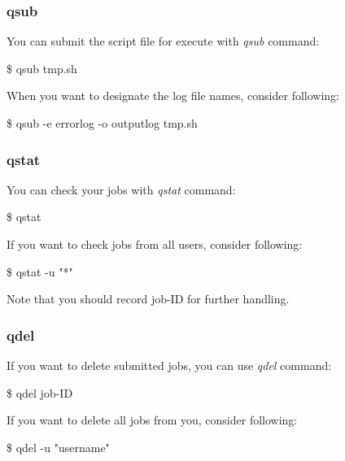 \documentclass{beamer}
\begin{document}
	\begin{frame}
		\frametitle{qsub}
		You can submit the script file for execute with \textit{qsub} command:
		\begin{example}
			\$ qsub tmp.sh
		\end{example}
	
		When you want to designate the log file names, consider following:
		\begin{example}
			\$ qsub -e errorlog -o outputlog tmp.sh
		\end{example}
	\end{frame}

	\begin{frame}
		\frametitle{qstat}
		You can check your jobs with \textit{qstat} command:
		\begin{example}
			\$ qstat
		\end{example}
	
		If you want to check jobs from all users, consider following:
		\begin{example}
			\$ qstat -u "*"
		\end{example}
	
		Note that you should record job-ID for further handling.
	\end{frame}

	\begin{frame}
		\frametitle{qdel}
		If you want to delete submitted jobs, you can use \textit{qdel} command:
		\begin{example}
			\$ qdel job-ID
		\end{example}
	
		If you want to delete all jobs from you, consider following:
		\begin{example}
			\$ qdel -u "username"
		\end{example}
	\end{frame}
\end{document}
